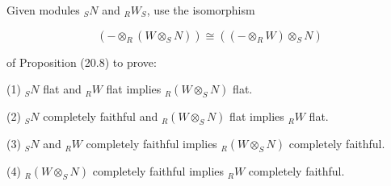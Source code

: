 Given modules ${}_S N$ and ${}_R W_S$, use the isomorphism

$$(- \otimes_R (W \otimes_S N)) \cong ((- \otimes_R W) \otimes_S N)$$

of Proposition (20.8) to prove:

(1) ${}_S N$ flat and ${}_R W$ flat implies ${}_R (W \otimes_S N)$ flat.

(2) ${}_S N$ completely faithful and ${}_R (W \otimes_S N)$ flat implies ${}_R W$ flat.

(3) ${}_S N$ and ${}_R W$ completely faithful implies ${}_R (W \otimes_S N)$ completely faithful.

(4) ${}_R (W \otimes_S N)$ completely faithful implies ${}_R W$ completely faithful.
